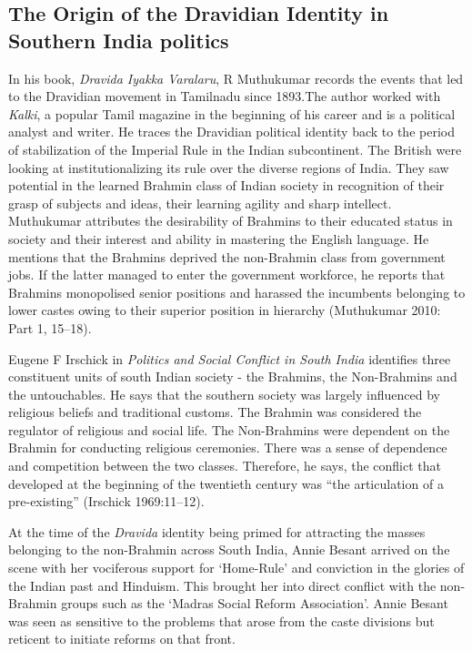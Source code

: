 \subsection*{The Origin of the Dravidian Identity in Southern India politics}

In his book, \textit{Dravida Iyakka Varalaru}, R Muthukumar records the events that led to the Dravidian movement in Tamilnadu since 1893.The author worked with \textit{Kalki}, a popular Tamil magazine in the beginning of his career and is a political analyst and writer. He traces the Dravidian political identity back to the period of stabilization of the Imperial Rule in the Indian subcontinent. The British were looking at institutionalizing its rule over the diverse regions of India. They saw potential in the learned Brahmin class of Indian society in recognition of their grasp of subjects and ideas, their learning agility and sharp intellect. Muthukumar attributes the desirability of Brahmins to their educated status in society and their interest and ability in mastering the English language. He mentions that the Brahmins deprived the non-Brahmin class from government jobs. If the latter managed to enter the government workforce, he reports that Brahmins monopolised senior positions and harassed the incumbents belonging to lower castes owing to their superior position in hierarchy (Muthukumar 2010: Part 1, 15–18).

Eugene F Irschick in \textit{Politics and Social Conflict in South India} identifies three constituent units of south Indian society - the Brahmins, the Non-Brahmins and the untouchables. He says that the southern society was largely influenced by religious beliefs and traditional customs. The Brahmin was considered the regulator of religious and social life. The Non-Brahmins were dependent on the Brahmin for conducting religious ceremonies. There was a sense of dependence and competition between the two classes. Therefore, he says, the conflict that developed at the beginning of the twentieth century was “the articulation of a pre-existing” (Irschick 1969:11–12).

At the time of the \textit{Dravida} identity being primed for attracting the masses belonging to the non-Brahmin across South India, Annie Besant arrived on the scene with her vociferous support for ‘Home-Rule’ and conviction in the glories of the Indian past and Hinduism. This brought her into direct conflict with the non-Brahmin groups such as the ‘Madras Social Reform Association’. Annie Besant was seen as sensitive to the problems that arose from the caste divisions but reticent to initiate reforms on that front.

